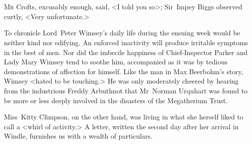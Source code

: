 \chapter[Chapter \thechapter]{}
\lettrine{M}{r} Crofts, excusably enough, said, <I told you so>; Sir~Impey Biggs observed curtly, <Very unfortunate.>

\zz
To chronicle Lord~Peter Wimsey's daily life during the ensuing week would be neither kind nor edifying. An enforced inactivity will produce irritable symptoms in the best of men. Nor did the imbecile happiness of Chief-Inspector Parker and Lady Mary Wimsey tend to soothe him, accompanied as it was by tedious demonstrations of affection for himself. Like the man in Max Beerbohm's story, Wimsey <hated to be touching.> He was only moderately cheered by hearing from the industrious Freddy Arbuthnot that Mr~Norman Urquhart was found to be more or less deeply involved in the disasters of the Megatherium Trust.

Miss~Kitty Climpson, on the other hand, was living in what she herself liked to call a <whirl of activity.> A letter, written the second day after her arrival in Windle, furnishes us with a wealth of particulars.

